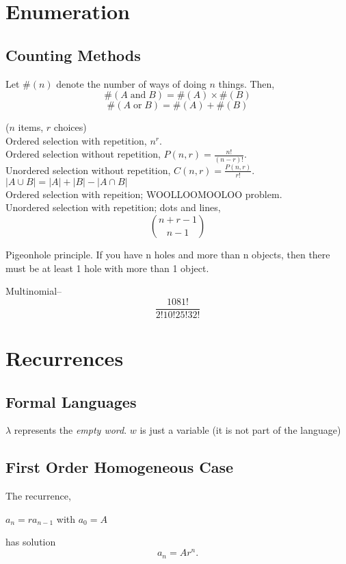 \documentclass[a4paper,10pt]{article}
\begin{document}
\section*{Enumeration}
\subsection*{Counting Methods}
Let $\#(n)$ denote the number of ways of doing $n$ things. Then,
$$\#(A\; \mbox{and}\; B) = \#(A) \times \#(B)$$
$$\#(A\; \mbox{or}\; B) = \#(A) + \#(B)$$

($n$ items, $r$ choices)\\
Ordered selection with repetition, $n^r$.\\

Ordered selection without repetition, $P(n,r) = \frac{n!}{(n-r)!}$.\\

Unordered selection without repetition, $C(n,r) = \frac{P(n,r)}{r!}$.\\

$|A \cup B| = |A| + |B| - |A \cap B|$\\

Ordered selection with repeition; WOOLLOOMOOLOO problem.\\

Unordered selection with repetition; dots and lines,
$$\binom{n+r-1}{n-1}$$

Pigeonhole principle. If you have n holes and more than n objects, then there must be at least 1 hole with more than 1 object.

Multinomial--\\
$$\frac{1081!}{2!10!25!32!}$$

\section*{Recurrences}
\subsection*{Formal Languages}
$\lambda$ represents the \textit{empty word}.
$w$ is just a variable (it is not part of the language)

\subsection*{First Order Homogeneous Case}
The recurrence,\\
\begin{center}$a_n = ra_{n-1}$ with $a_0=A$\\\end{center}
has solution\\
$$a_n=Ar^n.$$
\end{document}
